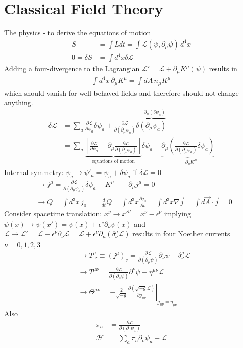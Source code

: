 \documentclass[10pt,a4paper]{book}
\theoremstyle{definition}
\begin{document}
\section{Classical Field Theory}
The physics - to derive the equations of motion 
\begin{align}
S&=\int L dt=\int\mathcal{L}(\psi,\partial_\mu\psi)\, d^4x\\
0=\delta S&=\int d^4x \delta \mathcal{L}
\end{align}
Adding a four-divergence to the Lagrangian $\mathcal{L}'=\mathcal{L}+\partial_\mu K^\mu(\psi)$ results in 
\begin{align}
\int d^4x\,\partial_\mu K^\mu=\int dA\,n_\mu K^\mu
\end{align}
which should vanish for well behaved fields and therefore should not change anything.
\begin{align}
\delta\mathcal{L}
&=\sum_a\frac{\partial\mathcal{L}}{\partial\psi_a}\delta\psi_a+\frac{\partial\mathcal{L}}{\partial(\partial_\mu\psi_a)}\overbrace{\delta(\partial_\mu\psi_a)}^{=\partial_\mu(\delta\psi_a)}\\
&=\sum_a\underbrace{\left[\frac{\partial\mathcal{L}}{\partial\psi_a}-\partial_\mu\frac{\partial\mathcal{L}}{\partial(\partial_\mu\psi_a)}\right]}_{\text{equations of motion}}\delta\psi_a+\underbrace{\partial_\mu\left(\frac{\partial\mathcal{L}}{\partial(\partial_\mu\psi_a)}\delta\psi_a\right)}_{=\partial_\mu K^\mu}
\end{align}
Internal symmetry: $\psi_a\rightarrow\psi'_a=\psi_a+\delta\psi_a$ if $\delta\mathcal{L}=0$
\begin{align}
&\rightarrow j^\mu=\frac{\partial\mathcal{L}}{\partial(\partial_\mu\psi_a)}\delta\psi_a-K^\mu\qquad\partial_\mu j^\mu=0\\
&\rightarrow Q=\int d^3x\,j_0\qquad \frac{d}{dt}Q=\int d^3x \frac{\partial j_0}{\partial t}=\int d^3x \nabla\vec{j}=\int d\vec{A}\cdot\vec{j}=0
\end{align}
Consider spacetime translation: $x^\nu\rightarrow x'^\nu=x^\nu-\epsilon^\nu$ implying $\psi(x)\rightarrow\psi(x')=\psi(x)+\epsilon^\nu\partial_\nu\psi(x)$ and $\mathcal{L}\rightarrow\mathcal{L}'=\mathcal{L}+\epsilon^\nu\partial_\nu\mathcal{L}=\mathcal{L}+\epsilon^\nu\partial_\mu(\delta^\mu_\nu\mathcal{L})$ results in four Noether currents $\nu=0,1,2,3$
\begin{align}
&\rightarrow T^\mu_{\;\nu}\equiv(j^\mu)_\nu=\frac{\partial\mathcal{L}}{\partial(\partial_\mu\psi)}\partial_\nu\psi-\delta^\mu_\nu\mathcal{L}\\
&\rightarrow T^{\mu\nu}=\frac{\partial\mathcal{L}}{\partial(\partial_\mu\psi)}\partial^\nu\psi-\eta^{\mu\nu}\mathcal{L}\\
&\rightarrow \Theta^{\mu\nu}=-\frac{2}{\sqrt{-g}}\left.\frac{\partial(\sqrt{-g}\mathcal{L})}{\partial g_{\mu\nu}}\right|_{g_{\mu\nu}=\eta_{\mu\nu}}
\end{align}
Also
\begin{align}
\pi_a&=\frac{\partial\mathcal{L}}{\partial(\partial_0\psi_a)}\\
\mathcal{H}&=\sum_a\pi_a\partial_o\psi_a-\mathcal{L}
\end{align}
\end{document}
